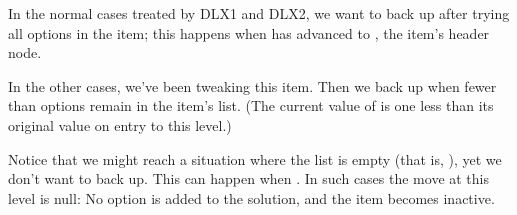 In the normal cases treated by {\mc DLX1} and {\mc DLX2}, we want to
back up after trying all options in the item; this happens when 
has advanced to , the item's header node.

In the other cases, we've been tweaking this item. Then
we back up when fewer than  options remain in
the item's list.
(The current value of  is one less than its original value
on entry to this level.)

Notice that we might reach a situation where the list is empty
(that is, ), yet we don't want to back up.
This can happen when . In such cases the move
at
this level is null: No option is added to the solution, and the
item becomes inactive.

